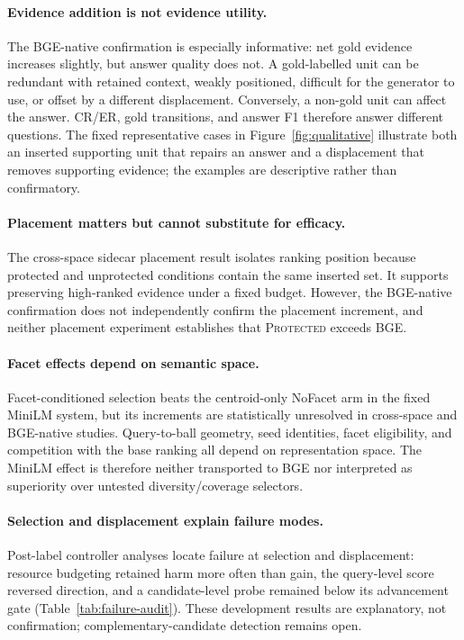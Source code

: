 \documentclass[11pt]{article}
\newcommand{\prot}{\textsc{Protected}\xspace}
\begin{document}
\paragraph{Evidence addition is not evidence utility.}
The BGE-native confirmation is especially informative: net gold evidence
increases slightly, but answer quality does not. A gold-labelled unit can be redundant
with retained context,
weakly positioned, difficult for the generator to use, or offset by a
different displacement. Conversely, a non-gold unit can affect the answer.
CR/ER, gold transitions, and answer F1 therefore answer different questions.
The fixed representative cases in Figure~\ref{fig:qualitative} illustrate both
an inserted supporting unit that repairs an answer and a displacement that
removes supporting evidence; the examples are descriptive rather than
confirmatory.

\paragraph{Placement matters but cannot substitute for efficacy.}
The cross-space sidecar placement result isolates ranking position because
protected and unprotected conditions contain the same inserted set. It
supports preserving high-ranked evidence under a fixed budget. However, the
BGE-native confirmation does not independently confirm the placement
increment, and neither placement
experiment establishes that \prot exceeds BGE.

\paragraph{Facet effects depend on semantic space.}
Facet-conditioned selection beats the centroid-only NoFacet arm in the fixed
MiniLM system, but its increments are statistically unresolved in cross-space and
BGE-native studies. Query-to-ball geometry, seed identities, facet eligibility,
and competition with the base ranking all depend on representation space. The
MiniLM effect is therefore neither transported to BGE nor interpreted as
superiority over untested diversity/coverage selectors.

\paragraph{Selection and displacement explain failure modes.}
Post-label controller analyses locate failure at selection and displacement:
resource budgeting retained harm more often than gain, the query-level score
reversed direction, and a candidate-level probe remained below its advancement
gate (Table~\ref{tab:failure-audit}). These development results are
explanatory, not confirmation; complementary-candidate detection remains open.
\end{document}

